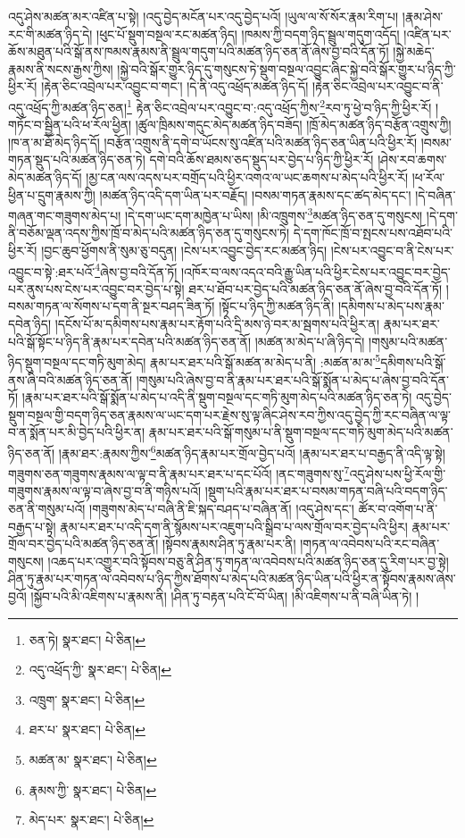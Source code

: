 འདུ་ཤེས་མཚན་མར་འཛིན་པ་སྟེ། །འདུ་བྱེད་མངོན་པར་འདུ་བྱེད་པའོ། །ཡུལ་ལ་སོ་སོར་རྣམ་རིག་པ། །རྣམ་ཤེས་རང་གི་མཚན་ཉིད་དེ། །ཕུང་པོ་སྡུག་བསྔལ་རང་མཚན་ཉིད། །ཁམས་ཀྱི་བདག་ཉིད་སྦྲུལ་གདུག་འདོད། །འཛིན་པར་ཆོས་མཐུན་པའི་སྒོ་ནས་ཁམས་རྣམས་ནི་སྦྲུལ་གདུག་པའི་མཚན་ཉིད་ཅན་ནོ་ཞེས་བྱ་བའི་དོན་ཏོ། །སྐྱེ་མཆེད་རྣམས་ནི་སངས་རྒྱས་ཀྱིས། །སྐྱེ་བའི་སྒོར་གྱུར་ཉིད་དུ་གསུངས་ཏེ་སྡུག་བསྔལ་འབྱུང་ཞིང་སྐྱེ་བའི་སྒོར་གྱུར་པ་ཉིད་ཀྱི་ཕྱིར་རོ། །རྟེན་ཅིང་འབྲེལ་པར་འབྱུང་བ་གང་། །དེ་ནི་འདུ་འཕྲོད་མཚན་ཉིད་དོ། །རྟེན་ཅིང་འབྲེལ་པར་འབྱུང་བ་ནི་འདུ་འཕྲོད་ཀྱི་མཚན་ཉིད་ཅན།\footnote{ཅན་ཏེ།  སྣར་ཐང་།  པེ་ཅིན། } རྟེན་ཅིང་འབྲེལ་པར་འབྱུང་བ་:འདུ་འཕྲོད་ཀྱིས་\footnote{འདུ་འཕྲོད་ཀྱི་  སྣར་ཐང་།  པེ་ཅིན། }རབ་ཏུ་ཕྱེ་བ་ཉིད་ཀྱི་ཕྱིར་རོ། །གཏོང་བ་སྦྱིན་པའི་ཕ་རོལ་ཕྱིན། །ཚུལ་ཁྲིམས་གདུང་མེད་མཚན་ཉིད་བཟོད། །ཁྲོ་མེད་མཚན་ཉིད་བརྩོན་འགྲུས་ཀྱི། །ཁ་ན་མ་ཐོ་མེད་ཉིད་དོ། །བརྩོན་འགྲུས་ནི་དགེ་བ་ཡོངས་སུ་འཛིན་པའི་མཚན་ཉིད་ཅན་ཡིན་པའི་ཕྱིར་རོ། །བསམ་གཏན་སྡུད་པའི་མཚན་ཉིད་ཅན་ཏེ། དགེ་བའི་ཆོས་ཐམས་ཅད་སྡུད་པར་བྱེད་པ་ཉིད་ཀྱི་ཕྱིར་རོ། །ཤེས་རབ་ཆགས་མེད་མཚན་ཉིད་དོ། །མྱ་ངན་ལས་འདས་པར་བགྲོད་པའི་ཕྱིར་འགའ་ལ་ཡང་ཆགས་པ་མེད་པའི་ཕྱིར་རོ། །ཕ་རོལ་ཕྱིན་པ་དྲུག་རྣམས་ཀྱི། །མཚན་ཉིད་འདི་དག་ཡིན་པར་བརྗོད། །བསམ་གཏན་རྣམས་དང་ཚད་མེད་དང་། །དེ་བཞིན་གཞན་གང་གཟུགས་མེད་པ། །དེ་དག་ཡང་དག་མཁྱེན་པ་ཡིས། །མི་འཁྲུགས་\footnote{འཁྲུག་  སྣར་ཐང་།  པེ་ཅིན། }མཚན་ཉིད་ཅན་དུ་གསུངས། །དེ་དག་ནི་བཅོམ་ལྡན་འདས་ཀྱིས་ཁྲོ་བ་མེད་པའི་མཚན་ཉིད་ཅན་དུ་གསུངས་ཏེ། དེ་དག་ཁོང་ཁྲོ་བ་སྤངས་པས་འཐོབ་པའི་ཕྱིར་རོ། །བྱང་ཆུབ་ཕྱོགས་ནི་སུམ་ཅུ་བདུན། །ངེས་པར་འབྱུང་བྱེད་རང་མཚན་ཉིད། །ངེས་པར་འབྱུང་བ་ནི་ངེས་པར་འབྱུང་བ་སྟེ་:ཐར་པའོ་\footnote{ཐར་པ་  སྣར་ཐང་།  པེ་ཅིན། }ཞེས་བྱ་བའི་དོན་ཏོ། །འཁོར་བ་ལས་འདའ་བའི་རྒྱུ་ཡིན་པའི་ཕྱིར་ངེས་པར་འབྱུང་བར་བྱེད་པར་ནུས་པས་ངེས་པར་འབྱུང་བར་བྱེད་པ་སྟེ། ཐར་པ་ཐོབ་པར་བྱེད་པའི་མཚན་ཉིད་ཅན་ནོ་ཞེས་བྱ་བའི་དོན་ཏོ། །བསམ་གཏན་ལ་སོགས་པ་དག་ནི་སྔར་བཤད་ཟིན་ཏོ། །སྟོང་པ་ཉིད་ཀྱི་མཚན་ཉིད་ནི། །དམིགས་པ་མེད་པས་རྣམ་དབེན་ཉིད། །དངོས་པོ་མ་དམིགས་པས་རྣམ་པར་རྟོག་པའི་དྲི་མས་ཉེ་བར་མ་སྦགས་པའི་ཕྱིར་ན། རྣམ་པར་ཐར་པའི་སྒོ་སྟོང་པ་ཉིད་ནི་རྣམ་པར་དབེན་པའི་མཚན་ཉིད་ཅན་ནོ། །མཚན་མ་མེད་པ་ཞི་ཉིད་དེ། །གསུམ་པའི་མཚན་ཉིད་སྡུག་བསྔལ་དང་གཏི་མུག་མེད། རྣམ་པར་ཐར་པའི་སྒོ་མཚན་མ་མེད་པ་ནི། :མཚན་མ་མ་\footnote{མཚན་མ་  སྣར་ཐང་།  པེ་ཅིན། }དམིགས་པའི་སྒོ་ནས་ཞི་བའི་མཚན་ཉིད་ཅན་ནོ། །གསུམ་པའི་ཞེས་བྱ་བ་ནི་རྣམ་པར་ཐར་པའི་སྒོ་སྨོན་པ་མེད་པ་ཞེས་བྱ་བའི་དོན་ཏོ། །རྣམ་པར་ཐར་པའི་སྒོ་སྨོན་པ་མེད་པ་འདི་ནི་སྡུག་བསྔལ་དང་གཏི་མུག་མེད་པའི་མཚན་ཉིད་ཅན་ཏེ། འདུ་བྱེད་སྡུག་བསྔལ་གྱི་བདག་ཉིད་ཅན་རྣམས་ལ་ཡང་དག་པར་རྗེས་སུ་ལྟ་ཞིང་ཤེས་རབ་ཀྱིས་འདུ་བྱེད་ཀྱི་རང་བཞིན་ལ་ལྟ་བ་ན་སྨོན་པར་མི་བྱེད་པའི་ཕྱིར་ན། རྣམ་པར་ཐར་པའི་སྒོ་གསུམ་པ་ནི་སྡུག་བསྔལ་དང་གཏི་མུག་མེད་པའི་མཚན་ཉིད་ཅན་ནོ། །རྣམ་ཐར་:རྣམས་ཀྱིས་\footnote{རྣམས་ཀྱི་  སྣར་ཐང་།  པེ་ཅིན། }མཚན་ཉིད་རྣམ་པར་གྲོལ་བྱེད་པའོ། །རྣམ་པར་ཐར་པ་བརྒྱད་ནི་འདི་ལྟ་སྟེ། གཟུགས་ཅན་གཟུགས་རྣམས་ལ་ལྟ་བ་ནི་རྣམ་པར་ཐར་པ་དང་པོའོ། །ནང་གཟུགས་སུ་\footnote{མེད་པར་  སྣར་ཐང་།  པེ་ཅིན། }འདུ་ཤེས་པས་ཕྱི་རོལ་གྱི་གཟུགས་རྣམས་ལ་ལྟ་བ་ཞེས་བྱ་བ་ནི་གཉིས་པའོ། །སྡུག་པའི་རྣམ་པར་ཐར་པ་བསམ་གཏན་བཞི་པའི་བདག་ཉིད་ཅན་ནི་གསུམ་པའོ། །གཟུགས་མེད་པ་བཞི་ནི་ཇི་སྐད་བཤད་པ་བཞིན་ནོ། །འདུ་ཤེས་དང་། ཚོར་བ་འགོག་པ་ནི་བརྒྱད་པ་སྟེ། རྣམ་པར་ཐར་པ་འདི་དག་ནི་སྙོམས་པར་འཇུག་པའི་སྒྲིབ་པ་ལས་གྲོལ་བར་བྱེད་པའི་ཕྱིར། རྣམ་པར་གྲོལ་བར་བྱེད་པའི་མཚན་ཉིད་ཅན་ནོ། །སྟོབས་རྣམས་ཤིན་ཏུ་རྣམ་པར་ནི། །གཏན་ལ་འབེབས་པའི་རང་བཞིན་གསུངས། །འཆད་པར་འགྱུར་བའི་སྟོབས་བཅུ་ནི་ཤིན་ཏུ་གཏན་ལ་འབེབས་པའི་མཚན་ཉིད་ཅན་དུ་རིག་པར་བྱ་སྟེ། ཤིན་ཏུ་རྣམ་པར་གཏན་ལ་འབེབས་པ་ཉིད་ཀྱིས་ཐོགས་པ་མེད་པའི་མཚན་ཉིད་ཡིན་པའི་ཕྱིར་ན་སྟོབས་རྣམས་ཞེས་བྱའོ། །སྐྱོབ་པའི་མི་འཇིགས་པ་རྣམས་ནི། །ཤིན་ཏུ་བརྟན་པའི་ངོ་བོ་ཡིན། །མི་འཇིགས་པ་ནི་བཞི་ཡིན་ཏེ། །
